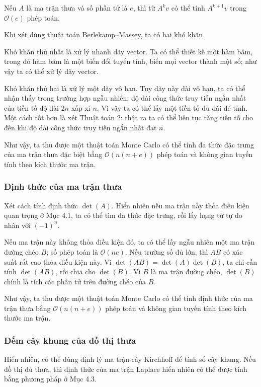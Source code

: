 \documentclass[11pt]{article}
\newcommand{\Oh}{\mathcal{O}}
\begin{document}
Nếu \(A\) là ma trận thưa và số phần tử là \(e\), thì từ \(A^kv\) có thể tính
\(A^{k+1}v\) trong \(\Oh(e)\) phép toán.

Khi xét dùng thuật toán Berlekamp--Massey, ta có hai khó khăn.

Khó khăn thứ nhất là xử lý nhanh dãy vector. Ta có thể thiết kế một hàm băm,
trong đó hàm băm là một biến đổi tuyến tính, biến mọi vector thành một số; như
vậy ta có thể xử lý dãy vector.

Khó khăn thứ hai là xử lý một dãy vô hạn. Tuy dãy này dài vô hạn, ta có thể
nhận thấy trong trường hợp ngẫu nhiên, độ dài công thức truy tiến ngắn nhất của
tiền tố độ dài \(2n\) xấp xỉ \(n\). Vì vậy ta có thể lấy một tiền tố đủ dài để
tính. Một cách tốt hơn là xét Thuật toán 2: thật ra ta có thể liên tục tăng
tiền tố cho đến khi độ dài công thức truy tiến ngắn nhất đạt \(n\).

Như vậy, ta thu được một thuật toán Monte Carlo có thể tính đa thức đặc trưng
của ma trận thưa đặc biệt bằng \(\Oh(n(n+e))\) phép toán và không gian tuyến
tính theo kích thước ma trận.

\subsubsection{Định thức của ma trận thưa}

Xét cách tính định thức \(\det(A)\). Hiển nhiên nếu ma trận này thỏa điều kiện
quan trọng ở Mục 4.1, ta có thể tìm đa thức đặc trưng, rồi lấy hạng tử tự do
nhân với \((-1)^n\).

Nếu ma trận này không thỏa điều kiện đó, ta có thể lấy ngẫu nhiên một ma trận
đường chéo \(B\); số phép toán là \(\Oh(ne)\). Nếu trường số đủ lớn, thì \(AB\)
có xác suất rất cao thỏa điều kiện này. Vì
\(\det(AB)=\det(A)\det(B)\), ta chỉ cần tính \(\det(AB)\), rồi chia cho
\(\det(B)\). Vì \(B\) là ma trận đường chéo, \(\det(B)\) chính là tích các phần
tử trên đường chéo của \(B\).

Như vậy, ta thu được một thuật toán Monte Carlo có thể tính định thức của ma
trận thưa bằng \(\Oh(n(n+e))\) phép toán và không gian tuyến tính theo kích
thước ma trận.

\subsubsection{Đếm cây khung của đồ thị thưa}

Hiển nhiên, có thể dùng định lý ma trận-cây Kirchhoff để tính số cây khung.
Nếu đồ thị đủ thưa, thì định thức của ma trận Laplace hiển nhiên có thể được
tính bằng phương pháp ở Mục 4.3.
\end{document}
